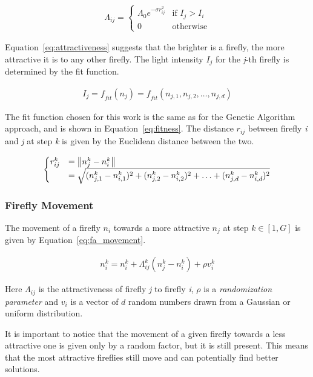 \begin{align}
\label{eq:attractiveness}
\Lambda_{ij}=
\begin{cases}
\Lambda_0 e^{-\sigma r_{ij}^2} & \text{if } I_j > I_i \\
0 & \text{otherwise}
\end{cases}
\end{align}

Equation~\ref{eq:attractiveness} suggests that the brighter is a firefly,
the more attractive it is to any other firefly. The light intensity $I_j$
for the \textit{j}-th firefly is determined by the fit function.

\begin{align}
I_j = \mathit{f}_{fit}(n_j) = \mathit{f}_{fit}(n_{j,1},n_{j,2},\ldots,n_{j,d})
\end{align}


The fit function chosen for this work is the same as for the Genetic Algorithm
approach, and is shown in Equation~\ref{eq:fitness}. 
The distance $r_{ij}$ between firefly \textit{i} and \textit{j}
at step \textit{k} is given by the Euclidean distance between the two.

\begin{equation}
\begin{cases}
r_{ij}^k &= \norm{n_j^k-n_i^k} \\ 
&= \sqrt{(n_{j,1}^k-n_{i,1}^k)^2+(n_{j,2}^k-n_{i,2}^k)^2+\ldots+(n_{j,d}^k-n_{i,d}^k)^2}
\end{cases}
\end{equation}

\subsubsection{Firefly Movement}
\label{sec:5.famovement}

The movement of a firefly $n_i$ towards a more attractive $n_j$ 
at step $k \in \left[1,G\right]$ is given by Equation~\ref{eq:fa_movement}.

\begin{align}
\label{eq:fa_movement}
n_i^k = n_i^k + \Lambda_{ij}^k\left(n_j^k-n_i^k\right)+\rho \mathit{v}_i^k
\end{align}

Here $\Lambda_{ij}$ is the attractiveness of firefly \textit{j} to firefly \textit{i},
$\rho$ is a \textit{randomization parameter} and $\mathit{v}_i$ is
a vector of $d$ random numbers drawn from a Gaussian or uniform distribution.

It is important to notice that the movement of a given firefly
towards a less attractive one is given only by a random factor, but it is still present.
This means that the most attractive fireflies still move and can
potentially find better solutions.

